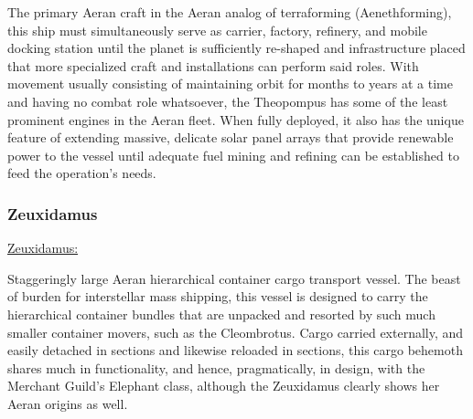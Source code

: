 The primary Aeran craft in the Aeran analog of terraforming
(Aenethforming), this ship must simultaneously serve as carrier,
factory, refinery, and mobile docking station until the planet is
sufficiently re-shaped and infrastructure placed that more specialized
craft and installations can perform said roles. With movement usually
consisting of maintaining orbit for months to years at a time and
having no combat role whatsoever, the Theopompus has some of the least
prominent engines in the Aeran fleet. When fully deployed, it also has
the unique feature of extending massive, delicate solar panel arrays
that provide renewable power to the vessel until adequate fuel mining
and refining can be established to feed the operation's needs.



\subsubsection{Zeuxidamus}
\href{http://vegastrike.sourceforge.net/wiki/Vessel:Zeuxidamus}{Zeuxidamus:}

Staggeringly large Aeran hierarchical container cargo transport
vessel. The beast of burden for interstellar mass shipping, this
vessel is designed to carry the hierarchical container bundles that
are unpacked and resorted by such much smaller container movers, such
as the Cleombrotus. Cargo carried externally, and easily detached in
sections and likewise reloaded in sections, this cargo behemoth shares
much in functionality, and hence, pragmatically, in design, with the
Merchant Guild's Elephant class, although the Zeuxidamus clearly shows
her Aeran origins as well.


